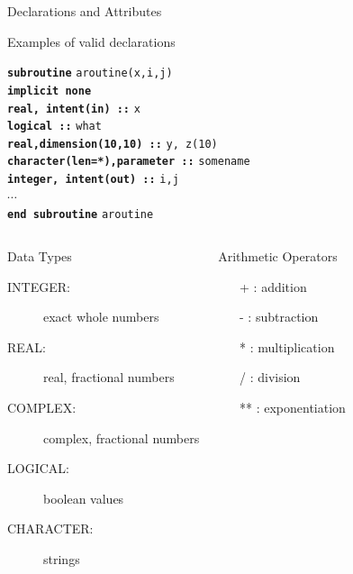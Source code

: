 \documentclass[slidestop,mathserif,compress,xcolor=svgnames]{beamer}
\newenvironment{bblock}[0]
{
\begin{beamerboxesrounded}[upper=uppercol1,lower=lowercol1,shadow=true]}
{\end{beamerboxesrounded}}
\begin{document}
\begin{frame}[allowframebreaks]
\begin{block}{\scriptsize Declarations and Attributes}
\begin{itemize}
    \end{itemize}
  \end{block}
  \begin{bblock}{Examples of valid declarations}
    \begin{tabbing}
      \textbf{\texttt{sub}}\=\textbf{\texttt{routine}} \texttt{aroutine(x,i,j)} \\
      \>\textbf{\texttt{implicit none}} \\
      \>\textbf{\texttt{real, intent(in) ::}} \texttt{x} \\
      \>\textbf{\texttt{logical ::}} \texttt{what} \\
      \>\textbf{\texttt{real,dimension(10,10) ::}} \texttt{y, z(10)} \\
      \>\textbf{\texttt{character(len=*),parameter ::}} \texttt{somename} \\
      \>\textbf{\texttt{integer, intent(out) ::}} \texttt{i,j} \\
      \> $\cdots$ \\
      \textbf{\texttt{end subroutine}} \texttt{aroutine}
    \end{tabbing}
  \end{bblock}
  \framebreak
  \begin{columns}
    \column{6cm}
    \begin{block}{\scriptsize Data Types}
      \begin{description}
      \item[INTEGER:]exact whole numbers
      \item[REAL:]real, fractional numbers
      \item[COMPLEX:]complex, fractional numbers
      \item[LOGICAL:]boolean values
      \item[CHARACTER:]strings
      \end{description}
    \end{block}
    \column{2.8cm}
    \begin{block}{\scriptsize Arithmetic Operators}
      \begin{itemize}
      \item[+]: addition
      \item[-]: subtraction
      \item[*]: multiplication
      \item[/]: division
      \item[**]: exponentiation
      \end{itemize}
    \end{block}

\end{columns}
\end{frame}
\end{document}
